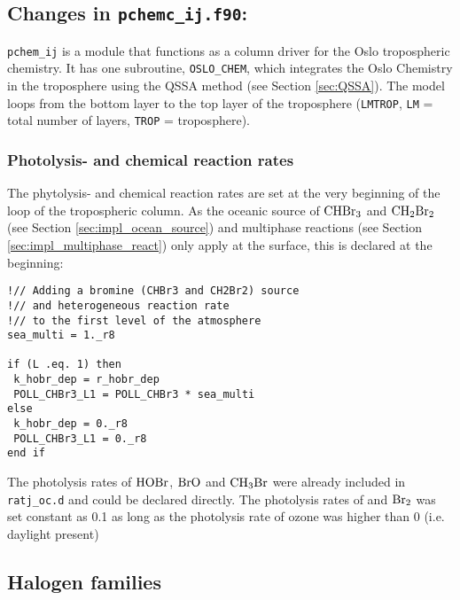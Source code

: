 


\subsection{Changes in \texttt{pchemc\_ij.f90}:}

\texttt{pchem\_ij} is a module that functions as a column driver for the Oslo tropospheric chemistry. It has one subroutine, \texttt{OSLO\_CHEM}, which integrates the Oslo Chemistry in the troposphere using the QSSA method (see Section \ref{sec:QSSA}). The model loops from the bottom layer to the top layer of the troposphere (\texttt{LMTROP}, \texttt{LM} = total number of layers, \texttt{TROP} = troposphere). 

\subsubsection{Photolysis- and chemical reaction rates}

The phytolysis- and chemical reaction rates are set at the very beginning of the loop of the tropospheric column. As the oceanic source of $\mathrm{CHBr_3}$ and $\mathrm{CH_2Br_2}$ (see Section \ref{sec:impl_ocean_source}) and multiphase reactions (see Section \ref{sec:impl_multiphase_react}) only apply at the surface, this is declared at the beginning:

\begin{lstlisting}
!// Adding a bromine (CHBr3 and CH2Br2) source 
!// and heterogeneous reaction rate 
!// to the first level of the atmosphere
sea_multi = 1._r8

if (L .eq. 1) then
 k_hobr_dep = r_hobr_dep
 POLL_CHBr3_L1 = POLL_CHBr3 * sea_multi
else
 k_hobr_dep = 0._r8
 POLL_CHBr3_L1 = 0._r8
end if
\end{lstlisting}


The photolysis rates of $\mathrm{HOBr}$, $\mathrm{BrO}$ and $\mathrm{CH_3Br}$ were already included in \texttt{ratj\_oc.d} and could be declared directly. The photolysis rates of  and $\mathrm{Br_2}$ was set constant as 0.1 as long as the photolysis rate of ozone was higher than 0 (i.e. daylight present)




\subsection{Halogen families}

